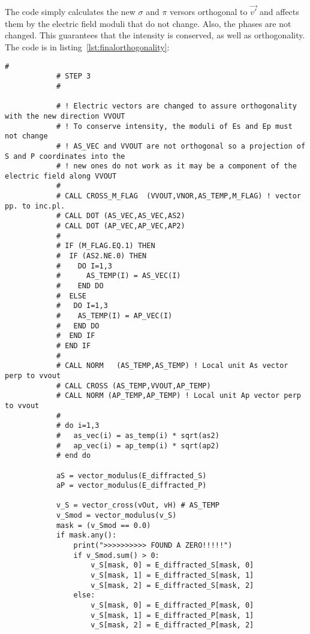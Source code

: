\documentclass{iucr}
\begin{document}


The code simply calculates the new $\sigma$ and $\pi$ versors orthogonal to $\vec{v'}$ and affects them by the electric field moduli that do not change. 
Also, the phases are not changed. 
This guarantees that the intensity is conserved, as well as orthogonality.
The code is in listing~\ref{lst:finalorthogonality}: 



\begin{lstlisting}[caption={Code to guarantee that the local $\sigma$ and $\pi$ electric fields hold the orthogonality relationships.}, label={lst:finalorthogonality}, captionpos=b]
            #
            # STEP 3
            #

            # ! Electric vectors are changed to assure orthogonality with the new direction VVOUT
            # ! To conserve intensity, the moduli of Es and Ep must not change
            # ! AS_VEC and VVOUT are not orthogonal so a projection of S and P coordinates into the
            # ! new ones do not work as it may be a component of the electric field along VVOUT
            #
            # CALL CROSS_M_FLAG  (VVOUT,VNOR,AS_TEMP,M_FLAG) ! vector pp. to inc.pl.
            # CALL DOT (AS_VEC,AS_VEC,AS2)
            # CALL DOT (AP_VEC,AP_VEC,AP2)
            #
            # IF (M_FLAG.EQ.1) THEN
            #  IF (AS2.NE.0) THEN
            #    DO I=1,3
            #      AS_TEMP(I) = AS_VEC(I)
            #    END DO
            #  ELSE
            #   DO I=1,3
            #    AS_TEMP(I) = AP_VEC(I)
            #   END DO
            #  END IF
            # END IF
            #
            # CALL NORM   (AS_TEMP,AS_TEMP) ! Local unit As vector perp to vvout
            # CALL CROSS (AS_TEMP,VVOUT,AP_TEMP)
            # CALL NORM (AP_TEMP,AP_TEMP) ! Local unit Ap vector perp to vvout
            #
            # do i=1,3
            #   as_vec(i) = as_temp(i) * sqrt(as2)
            #   ap_vec(i) = ap_temp(i) * sqrt(ap2)
            # end do

            aS = vector_modulus(E_diffracted_S)
            aP = vector_modulus(E_diffracted_P)

            v_S = vector_cross(vOut, vH) # AS_TEMP
            v_Smod = vector_modulus(v_S)
            mask = (v_Smod == 0.0)
            if mask.any():
                print(">>>>>>>>>> FOUND A ZERO!!!!!")
                if v_Smod.sum() > 0:
                    v_S[mask, 0] = E_diffracted_S[mask, 0]
                    v_S[mask, 1] = E_diffracted_S[mask, 1]
                    v_S[mask, 2] = E_diffracted_S[mask, 2]
                else:
                    v_S[mask, 0] = E_diffracted_P[mask, 0]
                    v_S[mask, 1] = E_diffracted_P[mask, 1]
                    v_S[mask, 2] = E_diffracted_P[mask, 2]


\end{lstlisting}
\end{document}
